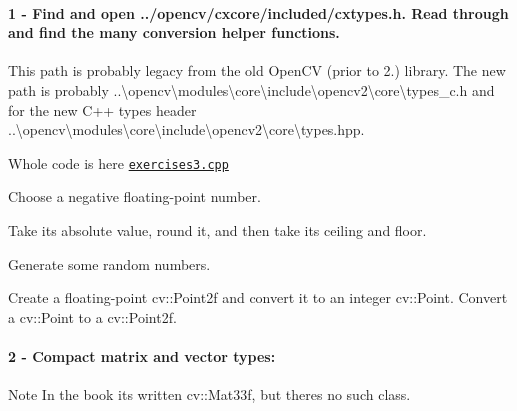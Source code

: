 \paragraph*{1 -\/ Find and open {\ttfamily ../opencv/cxcore/included/cxtypes.h}. Read through and find the many conversion helper functions.}

This path is probably legacy from the old Open\+CV (prior to 2.) library. The new path is probably {\ttfamily ..\textbackslash{}opencv\textbackslash{}modules\textbackslash{}core\textbackslash{}include\textbackslash{}opencv2\textbackslash{}core\textbackslash{}types\+\_\+c.\+h} and for the new C++ types header {\ttfamily ..\textbackslash{}opencv\textbackslash{}modules\textbackslash{}core\textbackslash{}include\textbackslash{}opencv2\textbackslash{}core\textbackslash{}types.\+hpp}.

Whole code is here \href{https://github.com/CodefroesPuc/learningOpencv3/blob/master/Cap3/exercises3.cpp}{\tt exercises3.\+cpp}
\begin{DoxyEnumerate}
\item Choose a negative floating-\/point number. 
\begin{DoxyCodeInclude}
\end{DoxyCodeInclude}

\item Take its absolute value, round it, and then take its ceiling and floor. 
\begin{DoxyCodeInclude}
\end{DoxyCodeInclude}

\item Generate some random numbers. 
\begin{DoxyCodeInclude}
\end{DoxyCodeInclude}

\item Create a floating-\/point {\ttfamily cv\+::\+Point2f} and convert it to an integer {\ttfamily cv\+::\+Point}. Convert a {\ttfamily cv\+::\+Point} to a {\ttfamily cv\+::\+Point2f}. 
\begin{DoxyCodeInclude}
\end{DoxyCodeInclude}
 \paragraph*{2 -\/ Compact matrix and vector types\+:}
\end{DoxyEnumerate}

\begin{DoxyNote}{Note}
In the book it\textquotesingle{}s written {\ttfamily cv\+::\+Mat33f}, but there\textquotesingle{}s no such class.
\end{DoxyNote}

